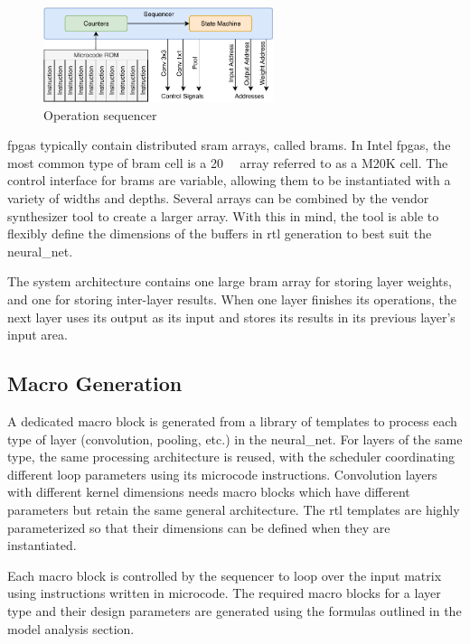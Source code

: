 \documentclass{uw-ece-wkrpt}
\begin{document}
\begin{figure}
\centering
\includegraphics[width=0.6\textwidth]{figures/sequencer}
\caption{Operation sequencer}\label{fig:sequencer}
\end{figure}

\glspl{fpga} typically contain distributed \gls{sram} arrays, called \glspl{bram}. In Intel \glspl{fpga}, the most common type of \gls{bram} cell is a \SI{20}{\kilo\bit} array referred to as a M20K cell. The control interface for \glspl{bram} are variable, allowing them to be instantiated with a variety of widths and depths. Several arrays can be combined by the vendor synthesizer tool to create a larger array. With this in mind, the tool is able to flexibly define the dimensions of the buffers in \gls{rtl} generation to best suit the \gls{neural_net}.

The system architecture contains one large \gls{bram} array for storing layer weights, and one for storing inter-layer results. When one layer finishes its operations, the next layer uses its output as its input and stores its results in its previous layer's input area.

\subsection{Macro Generation}\label{sec:macro_gen}

A dedicated macro block is generated from a library of templates to process each type of layer (convolution, pooling, etc.) in the \gls{neural_net}. For layers of the same type, the same processing architecture is reused, with the scheduler coordinating different loop parameters using its microcode instructions. Convolution layers with different \gls{kernel} dimensions needs macro blocks which have different parameters but retain the same general architecture. The \gls{rtl} templates are highly parameterized so that their dimensions can be defined when they are instantiated.

Each macro block is controlled by the sequencer to loop over the input matrix using instructions written in microcode. The required macro blocks for a layer type and their design parameters are generated using the formulas outlined in the model analysis section.
\end{document}
